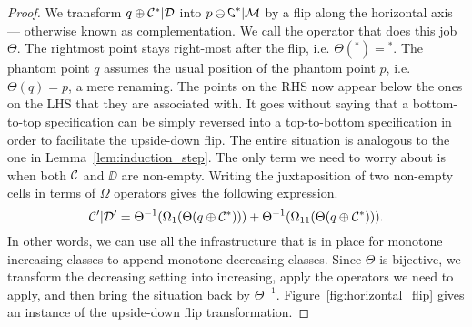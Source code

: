 \documentclass[12pt, a4paper, twoside]{report}
\begin{document}
\begin{proof}
We transform $q\oplus\mathcal{C}^*|\mathcal{D}$ into $p\ominus\reflectbox{\rotatebox[origin=c]{180}{\C}}^*|\M$ by a flip along the horizontal axis --- otherwise known as complementation. We call the operator that does this job $\Theta$. The rightmost point stays right-most after the flip, i.e. $\Theta({}^*) = {}^*$. The phantom point $q$ assumes the usual position of the phantom point $p$, i.e. $\Theta(q) = p$, a mere renaming. The points on the RHS now appear below the ones on the LHS that they are associated with. It goes without saying that a bottom-to-top specification can be simply reversed into a top-to-bottom specification in order to facilitate the upside-down flip. The entire situation is analogous to the one in Lemma~\ref{lem:induction_step}. The only term we need to worry about is when both $\mathcal{C}$ and $\DD$ are non-empty. Writing the juxtaposition of two non-empty cells in terms of $\Omega$ operators gives the following expression.
$$\mathcal{C}'|\mathcal{D}' = \Theta^{-1}(\Omega_1(\Theta(q\oplus \mathcal{C}^*))) + \Theta^{-1}(\Omega_{11}(\Theta(q \oplus \mathcal{C}^*))).$$ 
In other words, we can use all the infrastructure that is in place for monotone increasing classes to append monotone decreasing classes. Since $\Theta$ is bijective, we transform the decreasing setting into increasing, apply the operators we need to apply, and then bring the situation back by $\Theta^{-1}$. Figure~\ref{fig:horizontal_flip} gives an instance of the upside-down flip transformation.
\end{proof}
\end{document}

